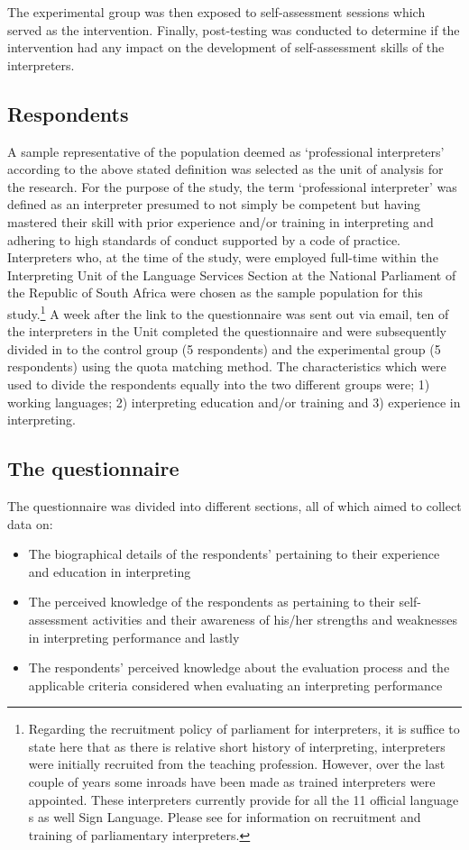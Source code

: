 \documentclass[output=paper]{langsci/langscibook}
\begin{document}
The experimental group was then exposed to self-assessment sessions which served as the intervention. Finally, post-testing was conducted to determine if the intervention had any impact on the development of self-assessment skills of the interpreters.

\subsection{Respondents}
A sample representative of the population deemed as ‘professional interpreters’ according to the above stated definition was selected as the unit of analysis for the research. For the purpose of the study, the term ‘professional interpreter’ was defined as an interpreter presumed to not simply be competent but having mastered their skill with prior experience and/or training in interpreting and adhering to high standards of conduct supported by a code of practice. Interpreters who, at the time of the study, were employed full-time within the Interpreting Unit of the Language Services Section at the National Parliament of the Republic of South Africa were chosen as the sample population for this study.\footnote{Regarding the recruitment policy of parliament for interpreters, it is suffice to state here that as there is relative short history of interpreting, interpreters were initially recruited from the teaching profession. However, over the last couple of years some inroads have been made as trained interpreters were appointed. These interpreters currently provide for all the 11 official language s as well Sign Language.  Please see \citet{Lesch2010} for information on recruitment and training of parliamentary interpreters.} A week after the link to the questionnaire was sent out via email, ten of the interpreters in the Unit completed the questionnaire and were subsequently divided in to the control group (5 respondents) and the experimental group (5 respondents) using the quota matching method.  The characteristics which were used to divide the respondents equally into the two different groups were; 1) working languages; 2) interpreting education and/or training and 3) experience in interpreting.

\subsection{The questionnaire}
The questionnaire was divided into different sections, all of which aimed to collect data on:

\begin{itemize}
\item The biographical details of the respondents’ pertaining to their experience and education in interpreting
\item The perceived knowledge of the respondents as pertaining to their self-assessment activities and their awareness of his/her strengths and weaknesses in interpreting performance and lastly
\item The respondents’ perceived knowledge about the evaluation process and the applicable criteria considered when evaluating an interpreting performance \end{itemize}
\end{document}
